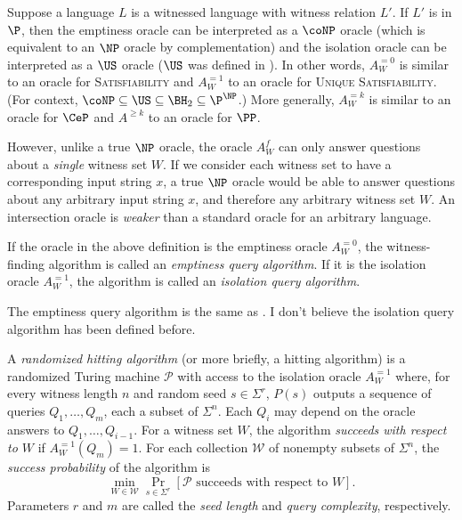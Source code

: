 \documentclass{article}
\newcommand{\mc}{\mathcal}
\begin{document}
Suppose a language $L$ is a witnessed language with witness relation $L'$.
If $L'$ is in $\P$, then the emptiness oracle can be interpreted as a $\coNP$ oracle (which is equivalent to an $\NP$ oracle by complementation) and the isolation oracle can be interpreted as a $\US$ oracle ($\US$ was defined in \autocite{bg82}).
In other words, $A^{=0}_W$ is similar to an oracle for \textsc{Satisfiability} and $A^{=1}_W$ to an oracle for \textsc{Unique Satisfiability}.
(For context, $\coNP \subseteq \US \subseteq \BH_2 \subseteq \P^\NP$.)
More generally, $A^{= k}_W$ is similar to an oracle for $\CeP$ and $A^{\geq k}$ to an oracle for $\PP$.

However, unlike a true $\NP$ oracle, the oracle $A^f_W$ can only answer questions about a \emph{single} witness set $W$.
If we consider each witness set to have a corresponding input string $x$, a true $\NP$ oracle would be able to answer questions about any arbitrary input string $x$, and therefore any arbitrary witness set $W$.
An intersection oracle is \emph{weaker} than a standard oracle for an arbitrary language.

\begin{definition}
  If the oracle in the above definition is the emptiness oracle $A^{=0}_W$, the witness-finding algorithm is called an \emph{emptiness query algorithm}.
  If it is the isolation oracle $A^{=1}_W$, the algorithm is called an \emph{isolation query algorithm}.
\end{definition}

The emptiness query algorithm is the same as \autocite[Definition~2]{krw12}.
I don't believe the isolation query algorithm has been defined before.

\begin{definition}
  A \emph{randomized hitting algorithm} (or more briefly, a hitting algorithm) is a randomized Turing machine $\mc{P}$ with access to the isolation oracle $A^{=1}_W$ where, for every witness length $n$ and random seed $s \in \Sigma^r$, $P(s)$ outputs a sequence of queries $Q_1, \dotsc, Q_m$, each a subset of $\Sigma^n$.
  Each $Q_i$ may depend on the oracle answers to $Q_1, \dotsc, Q_{i - 1}$.
  For a witness set $W$, the algorithm \emph{succeeds with respect to $W$} if $A^{=1}_W(Q_m) = 1$.
  For each collection $\mc{W}$ of nonempty subsets of $\Sigma^n$, the \emph{success probability} of the algorithm is
  \begin{equation*}
    \min_{W \in \mc{W}} \Pr_{s \in \Sigma^r} [\mc{P} \text{ succeeds with respect to } W].
  \end{equation*}
  Parameters $r$ and $m$ are called the \emph{seed length} and \emph{query complexity}, respectively.
\end{definition}
\end{document}
